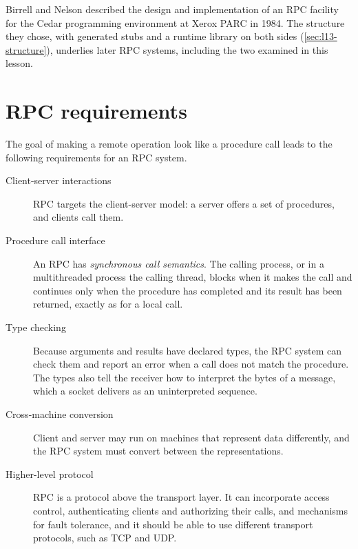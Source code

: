 \documentclass[../main.tex]{subfiles}
\begin{document}
Birrell and Nelson \cite{birrell1984} described the design and
implementation of an RPC facility for the Cedar programming environment at
Xerox PARC in 1984.  The structure they chose, with generated stubs and a
runtime library on both sides (\cref{sec:l13-structure}), underlies later
RPC systems, including the two examined in this lesson.

\section{RPC requirements}
\label{sec:l13-requirements}

The goal of making a remote operation look like a procedure call leads to
the following requirements for an RPC system.
\begin{description}
  \item[Client-server interactions] RPC targets the client-server model: a
    server offers a set of procedures, and clients call them.
  \item[Procedure call interface] An RPC has \emph{synchronous call
    semantics}.  The calling process, or in a multithreaded process the
    calling thread, blocks when it makes the call and continues only when
    the procedure has completed and its result has been returned, exactly
    as for a local call.
  \item[Type checking] Because arguments and results have declared types,
    the RPC system can check them and report an error when a call does not
    match the procedure.  The types also tell the receiver how to interpret
    the bytes of a message, which a socket delivers as an uninterpreted
    sequence.
  \item[Cross-machine conversion] Client and server may run on machines that
    represent data differently, and the RPC system must convert between
    the representations.
  \item[Higher-level protocol] RPC is a protocol above the transport layer.
    It can incorporate access control, authenticating clients and
    authorizing their calls, and mechanisms for fault tolerance, and it
    should be able to use different transport protocols, such as TCP and
    UDP.
\end{description}
\end{document}
